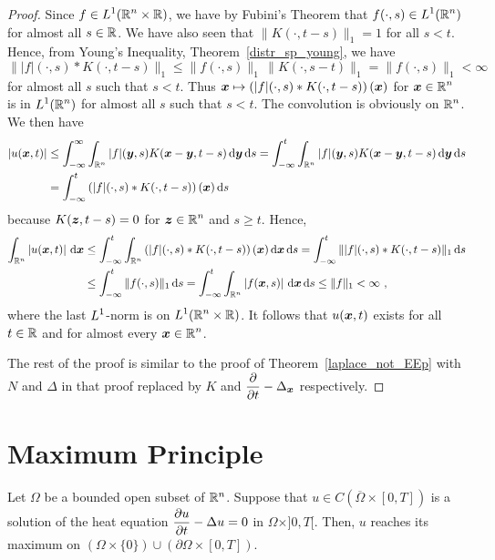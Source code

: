 \begin{proof}
Since $\displaystyle f\in L^1(\mathbb{R}^n\times \mathbb{R})$, we have by Fubini's
Theorem that $\displaystyle f(\cdot, s) \in L^1(\mathbb{R}^n)$ for almost all
$s\in \mathbb{R}$.  We have also seen that $\| K(\cdot, t-s) \|_1 = 1$ for
all $s<t$.  Hence, from 
Young's Inequality, Theorem~\ref{distr_sp_young}, we have
\[
\| |f|(\cdot,s) \ast K(\cdot, t-s) \|_1 \leq \|f(\cdot, s)\|_1\,
\|K(\cdot, s-t)\|_1 = \|f(\cdot, s)\|_1 < \infty
\]
for almost all $s$ such that $s<t$.  Thus
$\displaystyle {\bm{x}} \mapsto \left( |f|(\cdot,s) \ast K(\cdot, t-s)
\right)({\bm{x}})$ for $\displaystyle {\bm{x}} \in \mathbb{R}^n$ is in
$\displaystyle L^1(\mathbb{R}^n)$ for almost all $s$ such that $s<t$.  The
convolution is obviously on $\displaystyle \mathbb{R}^n$.  We then have
\begin{align*}
\left| u({\bm{x}},t)\right| &\leq
\int_{-\infty}^\infty \int_{\mathbb{R}^n} |f|({\bm{y}},s)
K({\bm{x}}-{\bm{y}}, t-s) \,\mathrm{d}{{\bm{y}}} \,\mathrm{d}{s}
= \int_{-\infty}^t \int_{\mathbb{R}^n} |f|({\bm{y}},s)
K({\bm{x}}-{\bm{y}}, t-s) \,\mathrm{d}{{\bm{y}}} \,\mathrm{d}{s} \\
&= \int_{-\infty}^t \left( |f|(\cdot,s) \ast K(\cdot, t-s)
\right)({\bm{x}}) \,\mathrm{d}{s}
\end{align*}
because $K({\bm{z}}, t-s) = 0$ for $\displaystyle {\bm{z}}\in \mathbb{R}^n$
and $s\geq t$.  Hence,
\begin{align*}
\int_{\mathbb{R}^n} \left| u({\bm{x}},t) \right| \,\mathrm{d}{{\bm{x}}} 
&\leq \int_{-\infty}^t \int_{\mathbb{R}^n} \left( |f|(\cdot,s) \ast K(\cdot, t-s)
\right)({\bm{x}}) \,\mathrm{d}{{\bm{x}}} \,\mathrm{d}{s}
= \int_{-\infty}^t \| |f|(\cdot,s) \ast K(\cdot, t-s) \|_1 \,\mathrm{d}{s} \\
&\leq \int_{-\infty}^t \|f(\cdot, s)\|_1 \,\mathrm{d}{s}
= \int_{-\infty}^t \int_{\mathbb{R}^n} \left| f({\bm{x}},s)\right| \,\mathrm{d}{{\bm{x}}}\,\mathrm{d}{s}
\leq \|f\|_1 < \infty \  ,
\end{align*}
where the last $\displaystyle L^1$-norm is on
$\displaystyle L^1(\mathbb{R}^n\times \mathbb{R})$.  It follows
that $u({\bm{x}},t)$ exists for all $t \in \mathbb{R}$ and for almost every
$\displaystyle {\bm{x}} \in \mathbb{R}^n$.

The rest of the proof is similar to the proof of
Theorem~\ref{laplace_not_EEp} with $N$ and $\Delta$ in that proof
replaced by $K$ and $\displaystyle \frac{\partial{}}{\partial t} - \Delta_{{\bm{x}}}$
respectively.
\end{proof}

\section{Maximum Principle}

\begin{theorem} 
Let $\Omega$ be a bounded open subset of $\mathbb{R}^n$.  Suppose that
$u \in C(\overline{\Omega} \times [0,T])$ is a solution of the heat
equation $\displaystyle \frac{\partial{u}}{\partial t} - \Delta u = 0$ in
$\Omega \times ]0,T[$.  Then, $u$ reaches its maximum on
$(\Omega \times \{0\}) \cup ( \partial \Omega \times [0,T])$.
\end{theorem}

